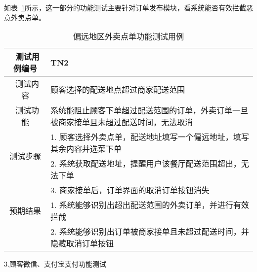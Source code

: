 如表~\ref{table:tn2}所示，这一部分的功能测试主要针对订单发布模块，看系统能否有效拦截恶意外卖点单。
\begin{table}[htbp!]
    \footnotesize
    \centering
    \caption{偏远地区外卖点单功能测试用例}
    \vspace{2mm}
    \begin{tabular}{cp{11.5cm}}
     \hline
     \ 测试用例编号 & TN2 \\ 
     \hline
     \ 测试内容 & 顾客选择的配送地点超过商家配送范围 \\ 
     \hline
     \ 测试功能 & 系统能阻止顾客下单超过配送范围的订单，外卖订单一旦被商家接单且未超过配送时间，无法取消 \\ 
     \hline
     \multirow{2}{*}{测试步骤}
      & 1.	顾客选择外卖点单，配送地址填写一个偏远地址，填写其余内容并选菜下单\\
      & 2.	系统获取配送地址，提醒用户该餐厅配送范围超出，无法下单 \\
      & 3.	商家接单后，订单界面的取消订单按钮消失 \\
     \hline
     \multirow{1}{*}{预期结果}
      & 1. 系统能够识别出超出配送范围的外卖订单，并进行有效拦截\\
      & 2. 系统能够识别出订单被商家接单且未超过配送时间，并隐藏取消订单按钮\\
    \hline
    \end{tabular}
    \label{table:tn2}
\end{table}

3.顾客微信、支付宝支付功能测试

